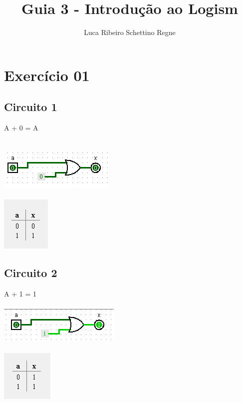 \documentclass[12pt]{article}
\title{Guia 3 - Introdução ao Logism}
\author{Luca Ribeiro Schettino Regne}
\begin{document}
 

\maketitle

\section{Exercício 01}
\subsection{Circuito 1}
A + 0 = A\\\\
\\\includegraphics{./images/circuito01.png}\\
\\\includegraphics{./images/circuito01_table.png}

\subsection{Circuito 2}
A + 1 = 1\\
\\\includegraphics{./images/circuito02.png}\\
\\\includegraphics{./images/circuito02_table.png}
\end{document}
